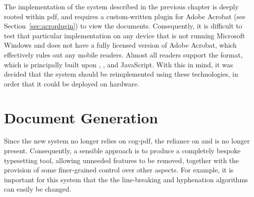 The implementation of the system described in the previous chapter is deeply rooted within \gls{pdf}, and requires a custom-written plugin for Adobe Acrobat (see Section~\ref{sec:acroplugin}) to view the documents. Consequently, it is difficult to test that particular implementation on any device that is not running Microsoft Windows and does not have a fully licensed version of Adobe Acrobat, which effectively rules out any mobile \ebook{} readers.
Almost all \ebook{} readers support the \epub{} format, which is principally built upon \html{}, \css{}, and JavaScript. With this in mind, it was decided that the system should be  reimplemented using these technologies, in order that it could be deployed on \ebook{} hardware. 



\section{Document Generation}
\label{sec:docgen}



Since the new system no longer relies on \gls{cog}-\gls{pdf}, the reliance on \troff{} and \pdfdit{} is no longer present. Consequently, a sensible approach is to produce a completely bespoke typesetting tool, allowing unneeded features to be removed, together with the provision of some finer-grained control over other aspects. For example, it is important for this system that the the line-breaking and hyphenation algorithms can easily be changed.

